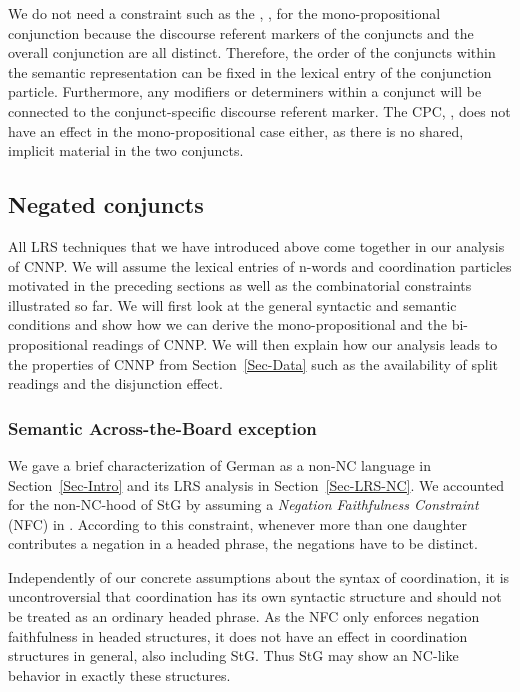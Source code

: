 \documentclass[output=paper]{langsci/langscibook}
\begin{document}
We do not need a constraint such as the \CCB{}, , for the mono-propositional conjunction because the discourse referent markers of the conjuncts and the overall conjunction are all distinct. 
Therefore, the order of the conjuncts within the semantic representation can be fixed in the lexical entry of the conjunction particle. 
Furthermore, any modifiers or determiners within a conjunct will be connected to the conjunct-specific discourse referent marker.
The CPC, , does not have an effect in the mono-propositional case either, as there is no shared, implicit material in the two conjuncts.


\subsection{Negated conjuncts}
\label{Sec-AnalysisCNNP}


All LRS techniques that we have introduced above come together in our analysis of CNNP. 
We will assume the lexical entries of n-words and coordination particles motivated in the preceding sections as well as the combinatorial constraints illustrated so far.
We will first look at the general syntactic and semantic conditions and show how we can derive the mono-propositional and the bi-propositional readings of CNNP. 
We will then explain how our analysis leads to the properties of CNNP from Section~\ref{Sec-Data} such as the availability of split readings and the disjunction effect. 

\subsubsection{Semantic Across-the-Board exception}
\label{Sec-SemATB}

We gave a brief characterization of German as a non-NC language in Section~\ref{Sec-Intro}
and its LRS analysis in Section~\ref{Sec-LRS-NC}. We accounted for the non-NC-hood of StG by assuming a \emph{Negation Faithfulness Constraint} (NFC) in . According to this constraint, whenever more than one daughter contributes a negation in a headed phrase, the negations have to be distinct.

Independently of our concrete assumptions about the syntax of coordination, it is uncontroversial that coordination has its own syntactic structure and should not be treated as an ordinary headed phrase. 
As the NFC only enforces negation faithfulness in headed structures, it does not have an effect in coordination structures in general, also including StG. Thus StG may show an NC-like behavior in exactly these structures.
\end{document}
